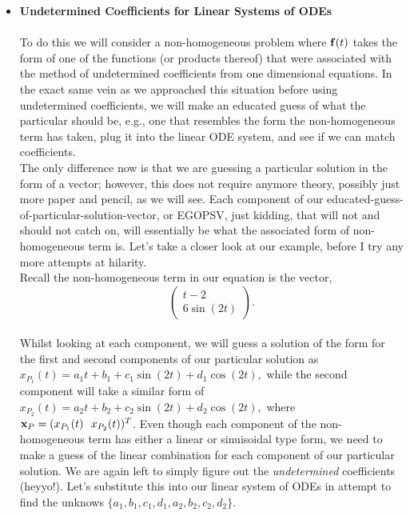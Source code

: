 \begin{itemize}

%
%
\item {\bf{Undetermined Coefficients for Linear Systems of ODEs}} \\ \\

To do this we will consider a non-homogeneous problem where ${\bf{f}}(t)$ takes the form of one of the functions (or products thereof) that were associated with the method of undetermined coefficients from one dimensional equations. In the exact same vein as we approached this situation before using undetermined coefficients, we will make an educated guess of what the particular should be, e.g., one that resembles the form the non-homogeneous term has taken, plug it into the linear ODE system, and see if we can match coefficients. \\

The only difference now is that we are guessing a particular solution in the form of a vector; however, this does not require anymore theory, possibly just more paper and pencil, as we will see. Each component of our educated-guess-of-particular-solution-vector, or EGOPSV, just kidding, that will not and should not catch on, will essentially be what the associated form of non-homogeneous term is. Let's take a closer look at our example, before I try any more attempts at hilarity.\\

Recall the non-homogeneous term in our equation is the vector, \\$$\left( \begin{array}{c}  t-2 \\  6\sin(2t)  \end{array} \right).$$\\
%
Whilst looking at each component, we will guess a solution of the form for the first and second components of our particular solution as $x_{P_{1}}(t) = a_1t+b_1 +c_1\sin(2t)+d_1\cos(2t),$ while the second component will take a similar form of $x_{P_{2}}(t) =  a_2t+b_2 + c_2\sin(2t) + d_2\cos(2t),$ where ${\bf{x}}_P = (x_{P_1}(t)\ \ x_{P_2}(t) )^T$. Even though each component of the non-homogeneous term has either a linear or sinuisoidal type form, we need to make a guess of the linear combination for each component of our particular solution. We are again left to simply figure out the \emph{undetermined} coefficients (heyyo!). Let's substitute this into our linear system of ODEs in attempt to find the unknows $\{a_1,b_1,c_1,d_1,a_2,b_2,c_2,d_2\}$. \\ 


\end{itemize}
